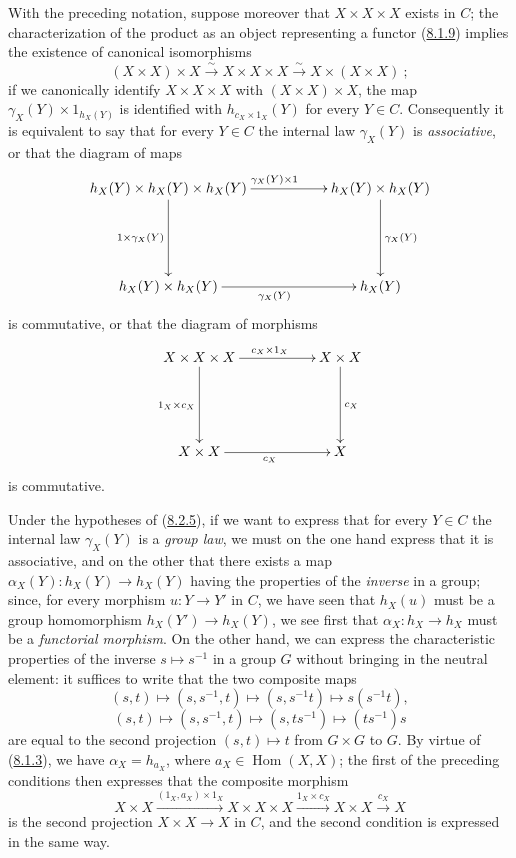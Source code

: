 \begin{env}[8.2.5]
\label{0.8.2.5}
With the preceding notation, suppose moreover that $X\times X\times X$
exists in $C$; the characterization of the product as an object representing a
functor (\hyperref[0.8.1.9]{8.1.9}) implies the existence of canonical
isomorphisms
\[
  (X\times X)\times X\xrightarrow{\sim}X\times X\times X
  \xrightarrow{\sim}X\times(X\times X)~;
\]
if we canonically identify $X\times X\times X$ with $(X\times X)\times X$,
the map $\gamma_X(Y)\times 1_{h_X(Y)}$ is identified with
$h_{c_X\times 1_X}(Y)$ for every $Y\in C$. Consequently it is equivalent to
say that for every $Y\in C$ the internal law $\gamma_X(Y)$ is
\emph{associative}, or that the diagram of maps
\[
  \xymatrix{
    h_X(Y)\times h_X(Y)\times h_X(Y)
      \ar[rr]^{\gamma_X(Y)\times 1}\ar[dd]_{1\times\gamma_X(Y)} &&
    h_X(Y)\times h_X(Y)\ar[dd]^{\gamma_X(Y)}\\\\
    h_X(Y)\times h_X(Y)\ar[rr]_{\gamma_X(Y)} && h_X(Y)
  }
\]
is commutative, or that the diagram of morphisms
\[
  \xymatrix{
    X\times X\times X
      \ar[rr]^{c_X\times 1_X}\ar[dd]_{1_X\times c_X} &&
    X\times X\ar[dd]^{c_X}\\\\
    X\times X\ar[rr]_{c_X} && X
  }
\]
is commutative.
\end{env}

\begin{env}[8.2.6]
\label{0.8.2.6}
Under the hypotheses of (\hyperref[0.8.2.5]{8.2.5}), if we want to express
that for every $Y\in C$ the internal law $\gamma_X(Y)$ is a \emph{group
law}, we must on the one hand express that it is associative, and on the
other that there exists a map $\alpha_X(Y):h_X(Y)\to h_X(Y)$ having the
properties of the \emph{inverse} in a group; since, for every morphism
$u:Y\to Y'$ in $C$, we have seen that $h_X(u)$ must be a group
homomorphism $h_X(Y')\to h_X(Y)$, we see first that $\alpha_X:h_X\to h_X$
must be a \emph{functorial morphism}. On the other hand, we can express the
characteristic properties of the inverse $s\mapsto s^{-1}$ in a group
$G$ without bringing in the neutral element: it suffices to write that the
two composite maps
\[
  (s,t)\mapsto(s,s^{-1},t)\mapsto(s,s^{-1}t)\mapsto s(s^{-1}t),
\]
\[
  (s,t)\mapsto(s,s^{-1},t)\mapsto(s,ts^{-1})\mapsto(ts^{-1})s
\]
are equal to the second projection $(s,t)\mapsto t$ from $G\times G$ to
$G$. By virtue of (\hyperref[0.8.1.3]{8.1.3}), we have
$\alpha_X=h_{a_X}$, where $a_X\in\operatorname{Hom}(X,X)$; the first
of the preceding conditions then expresses that the composite morphism
\[
  X\times X\xrightarrow{(1_X,a_X)\times 1_X}X\times X\times X
  \xrightarrow{1_X\times c_X}X\times X\xrightarrow{c_X}X
\]
is the second projection $X\times X\to X$ in $C$, and the second condition
is expressed in the same way.
\end{env}

